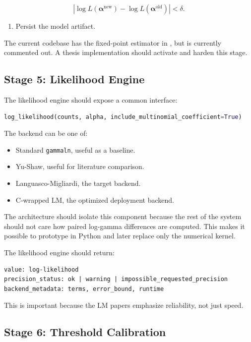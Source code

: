 \documentclass[11pt,a4paper]{article}
\begin{document}
\[
\left|\log L(\boldsymbol{\alpha}^{\mathrm{new}})
-\log L(\boldsymbol{\alpha}^{\mathrm{old}})\right|<\delta.
\]

\begin{enumerate}[resume]
  \item Persist the model artifact.
\end{enumerate}

The current codebase has the fixed-point estimator in , but  is currently commented out. A thesis implementation should activate and harden this stage.

\subsection{Stage 5: Likelihood Engine}

The likelihood engine should expose a common interface:

\begin{lstlisting}[language=Python]
log_likelihood(counts, alpha, include_multinomial_coefficient=True)
\end{lstlisting}

The backend can be one of:

\begin{itemize}
  \item Standard \texttt{gammaln}, useful as a baseline.
  \item Yu-Shaw, useful for literature comparison.
  \item Languasco-Migliardi, the target backend.
  \item C-wrapped LM, the optimized deployment backend.
\end{itemize}

The architecture should isolate this component because the rest of the system should not care how paired log-gamma differences are computed. This makes it possible to prototype in Python and later replace only the numerical kernel.

The likelihood engine should return:

\begin{lstlisting}
value: log-likelihood
precision_status: ok | warning | impossible_requested_precision
backend_metadata: terms, error_bound, runtime
\end{lstlisting}

This is important because the LM papers emphasize reliability, not just speed.

\subsection{Stage 6: Threshold Calibration}
\end{document}
